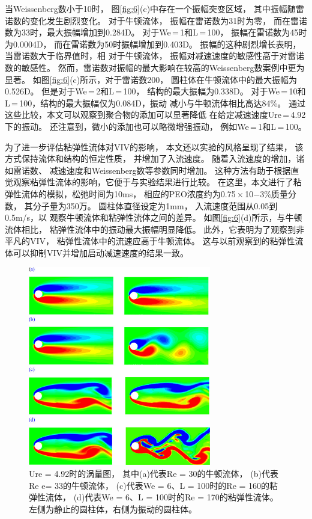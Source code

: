 \documentclass[UTF8,zihao=5]{ctexart} %
\begin{document}
当Weissenberg数小于10时，
图\ref{fig:6}(c)中存在一个振幅突变区域，
其中振幅随雷诺数的变化发生剧烈变化。
对于牛顿流体，
振幅在雷诺数为31时为零，
而在雷诺数为33时，最大振幅增加到0.284D。
对于We = 1和L = 100，
振幅在雷诺数为45时为0.0004D，
而在雷诺数为50时振幅增加到0.403D。
振幅的这种剧烈增长表明，
当雷诺数大于临界值时，相
对于牛顿流体，
振幅对减速速度的敏感性高于对雷诺数的敏感性。
然而，雷诺数对振幅的最大影响在较高的Weissenberg数案例中更为显著。
如图\ref{fig:6}(c)所示，对于雷诺数200，
圆柱体在牛顿流体中的最大振幅为0.526D。
但是对于We = 2和L = 100，
结构的最大振幅为0.338D。
对于We = 10和L = 100，结构的最大振幅仅为0.084D，振动
减小与牛顿流体相比高达84\%。
通过这些比较，本文可以观察到聚合物的添加可以显著降低
在给定减速速度Ure = 4.92下的振动。
还注意到，微小的添加也可以略微增强振动，
例如We = 1和L = 100。

为了进一步评估粘弹性流体对VIV的影响，
本文还以实验的风格呈现了结果，
该方式保持流体和结构的恒定性质，
并增加了入流速度。
随着入流速度的增加，诸如雷诺数、
减速速度和Weissenberg数等参数同时增加。
这种方法有助于根据直觉观察粘弹性流体的影响，它便于与实验结果进行比较。
在这里，本文进行了粘弹性流体的模拟，松弛时间为10ms，
相应的PEO浓度约为0.75 × 10−3\%质量分数，
其分子量为350万。
圆柱体直径设定为1mm，
入流速度范围从0.05到0.5m/s，以
观察牛顿流体和粘弹性流体之间的差异。
如图\ref{fig:6}(d)所示，与牛顿流体相比，
粘弹性流体中的振动最大振幅明显降低。
此外，它表明为了观察到非平凡的VIV，
粘弹性流体中的流速应高于牛顿流体。
这与以前观察到的粘弹性流体可以抑制VIV并增加启动减速速度的结果一致。

\begin{figure}[H]
    \centering
    \includegraphics[width=8cm]{fig7.jpg}
    \caption{
        Ure = 4.92时的涡量图，
        其中(a)代表Re = 30的牛顿流体，
        (b)代表Re e= 33的牛顿流体，
        (c)代表We = 6、L = 100时的Re = 160的粘弹性流体，
        (d)代表We = 6、L = 100时的Re = 170的粘弹性流体。左侧为静止的圆柱体，右侧为振动的圆柱体。
    }
    \label{fig:7}
\end{figure}
\end{document}
